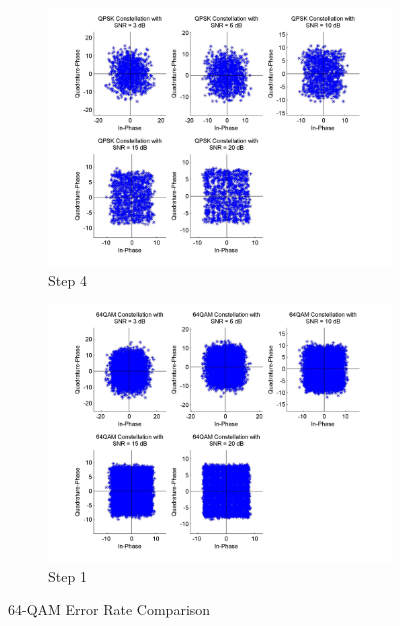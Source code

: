 \documentclass[]{article}
\begin{document}
\newpage
\begin{figure}[h]
        \centering
        \begin{subfigure}[b]{0.6\textwidth}
                \includegraphics[width=\textwidth]{qam64Const.jpg}
                \caption{Step 4}
                \label{fig:qam64Const}
        \end{subfigure}%
        \qquad \quad %
        \begin{subfigure}[b]{0.6\textwidth}
                \includegraphics[width=\textwidth]{qam64Const1.jpg}
                \caption{Step 1}
                \label{fig:qam64Const1}
        \end{subfigure}
        \caption{64-QAM Error Rate Comparison }
\end{figure}
\end{document}

